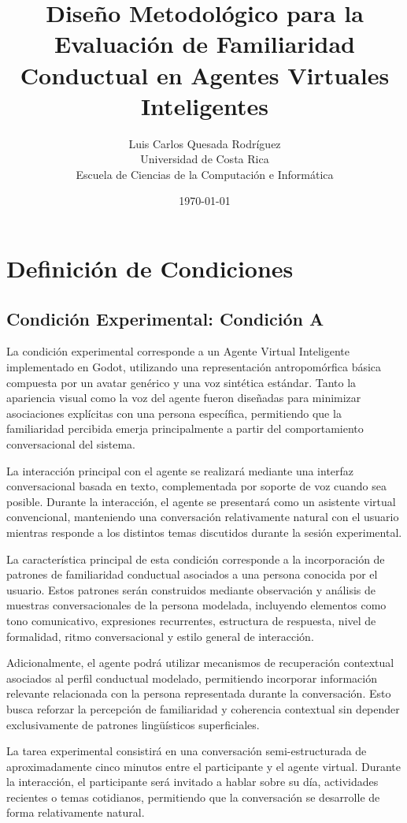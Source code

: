 \documentclass[12pt]{article}
\title{
\textbf{Diseño Metodológico para la Evaluación de Familiaridad Conductual en Agentes Virtuales Inteligentes}
}
\author{
Luis Carlos Quesada Rodríguez\\
Universidad de Costa Rica\\
Escuela de Ciencias de la Computación e Informática
}
\date{\today}
\begin{document}
\maketitle

\section{Definición de Condiciones}

\subsection{Condición Experimental: Condición A}

La condición experimental corresponde a un Agente Virtual Inteligente implementado en Godot, utilizando una representación antropomórfica básica compuesta por un avatar genérico y una voz sintética estándar. Tanto la apariencia visual como la voz del agente fueron diseñadas para minimizar asociaciones explícitas con una persona específica, permitiendo que la familiaridad percibida emerja principalmente a partir del comportamiento conversacional del sistema.

La interacción principal con el agente se realizará mediante una interfaz conversacional basada en texto, complementada por soporte de voz cuando sea posible. Durante la interacción, el agente se presentará como un asistente virtual convencional, manteniendo una conversación relativamente natural con el usuario mientras responde a los distintos temas discutidos durante la sesión experimental.

La característica principal de esta condición corresponde a la incorporación de patrones de familiaridad conductual asociados a una persona conocida por el usuario. Estos patrones serán construidos mediante observación y análisis de muestras conversacionales de la persona modelada, incluyendo elementos como tono comunicativo, expresiones recurrentes, estructura de respuesta, nivel de formalidad, ritmo conversacional y estilo general de interacción.

Adicionalmente, el agente podrá utilizar mecanismos de recuperación contextual asociados al perfil conductual modelado, permitiendo incorporar información relevante relacionada con la persona representada durante la conversación. Esto busca reforzar la percepción de familiaridad y coherencia contextual sin depender exclusivamente de patrones lingüísticos superficiales.

La tarea experimental consistirá en una conversación semi-estructurada de aproximadamente cinco minutos entre el participante y el agente virtual. Durante la interacción, el participante será invitado a hablar sobre su día, actividades recientes o temas cotidianos, permitiendo que la conversación se desarrolle de forma relativamente natural.
\end{document}
